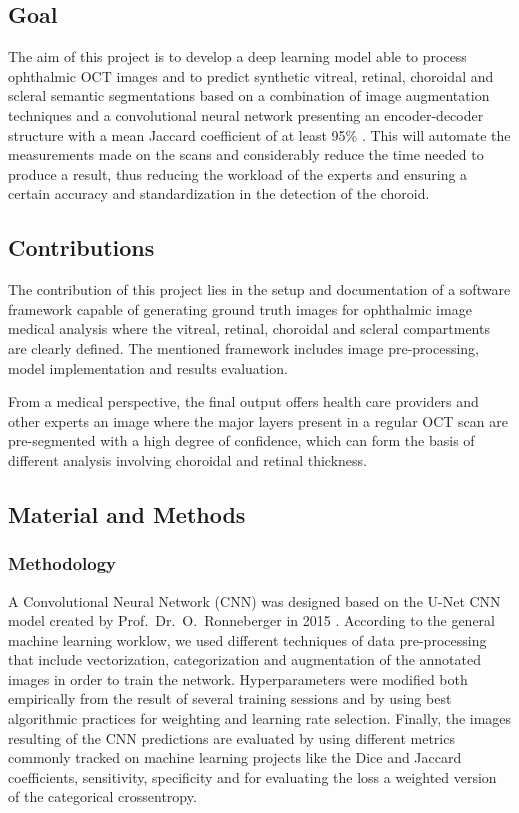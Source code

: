\documentclass[12pt,a4paper]{scrartcl}
\begin{document}
\subsection{Goal}
The aim of this project is to develop a deep learning model able to process  ophthalmic  OCT  images  and to predict  synthetic  vitreal,  retinal,  choroidal  and  scleral  semantic  segmentations  based  on  a  combination  of  image  augmentation  techniques  and  a convolutional neural network presenting an encoder-decoder structure with a mean Jaccard coefficient of at least 95\%   \cite{Maloca2019}. This will automate the measurements made on the scans and considerably reduce the time needed to produce a result, thus reducing the workload of the experts and ensuring a certain accuracy and standardization in the detection of the choroid. 

\subsection{Contributions}

The contribution of this project lies in the setup and documentation of a software framework capable of generating ground truth images for ophthalmic image medical analysis where the vitreal, retinal, choroidal and scleral compartments are clearly defined. The mentioned framework includes image pre-processing, model implementation and results evaluation. 

From a medical perspective, the final output offers health care providers and other experts an image where the major layers present in a regular OCT scan are pre-segmented with a high degree of confidence, which can form the basis of different analysis involving choroidal and retinal thickness. 

\subsection{Material and Methods}

\subsubsection{Methodology}

A Convolutional Neural Network (CNN) was designed based on the U-Net CNN model created by Prof.~Dr.~O.~Ronneberger in 2015 \cite{Ronneberger2015}. According to the general machine learning worklow, we used different techniques of data pre-processing that include vectorization, categorization and augmentation of the annotated images in order to train the network. Hyperparameters were modified both empirically from the result of several training sessions and by using best algorithmic practices for weighting and learning rate selection. Finally, the images resulting of the CNN predictions are evaluated by using different metrics commonly tracked on machine learning projects like the Dice and Jaccard coefficients, sensitivity, specificity and for evaluating the loss a weighted version of the categorical crossentropy. 
\end{document}
